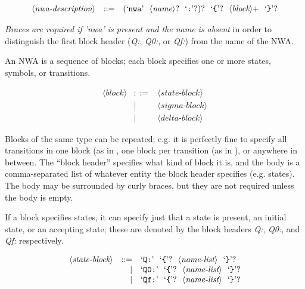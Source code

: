 \newenvironment{grammar}{\begin{equation*}\begin{array}{lrl}}{\end{array}\end{equation*}}
\newcommand{\nonterm}[1]{\ensuremath{\langle}\textit{#1}\ensuremath{\rangle}}
\newcommand{\term}[1]{\textrm`\texttt{#1}\textrm'}
\newcommand{\cfgsp}{\ \ }

\begin{grammar}
  \nonterm{nwa-description} & ::= & \left(\term{nwa}\cfgsp\nonterm{name}?\cfgsp\term{:}?\right)?\cfgsp\term{\{}?\cfgsp\nonterm{block}{+}\cfgsp\term{\}}?
\end{grammar}

\textsl{Braces are required if 'nwa' is present and the name is absent}
 in order to
 distinguish the first block header (\textsl{Q:}, \textsl{Q0:},
 or \textsl{Qf:}) from the name of the NWA.

An NWA is a sequence of blocks; each block specifies one or more
states, symbols, or transitions.

\begin{grammar}
  \nonterm{block} &  ::= & \nonterm{state-block} \\
                  &    | & \nonterm{sigma-block} \\
                  &    | & \nonterm{delta-block}
\end{grammar}

Blocks of the same type can be repeated; e.g. it is perfectly fine to
specify all transitions in one block (as in ,
one block per transition (as in ), or
anywhere in between. The ``block header'' specifies what kind of block
it is, and the body is a comma-separated list of whatever entity the
block header specifies (e.g. states). The body may be surrounded by
curly braces, but they are not required unless the body is empty.

If a block specifies states, it can specify just that a state is
present, an initial state, or an accepting state; these are denoted by
the block headers \textsl{Q:}, \textsl{Q0:}, and \textsl{Qf:}
respectively.
 
\begin{grammar}
  \nonterm{state-block} &  ::= & \term{Q:} \cfgsp \term\{? \cfgsp \nonterm{name-list}\cfgsp\term\}? \\
                        &   |  & \term{Q0:}\cfgsp \term\{? \cfgsp \nonterm{name-list}\cfgsp\term\}? \\
                        &   |  & \term{Qf:}\cfgsp \term\{? \cfgsp \nonterm{name-list}\cfgsp\term\}?
\end{grammar}

